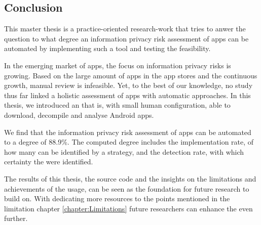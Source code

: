 \subsection{Conclusion}

This master thesis is a practice-oriented research-work that tries to anwer the question to what degree an information privacy risk assessment of \mH apps can be automated by implementing such a tool and testing the feasibility.

In the emerging market of \mH apps, the focus on information privacy risks is growing.
Based on the large amount of apps in the app stores and the continuous growth, manual review is infeasible.
Yet, to the best of our knowledge, no study thus far linked a holistic \ipr assessment of \mH apps with automatic \sca approaches.
In this thesis, we introduced an \aiprat that is, with small human configuration, able to download, decompile and analyse Android \mH apps.

We find that the information privacy risk assessment of \mH apps can be automated to a degree of 88.9\%.
The computed degree includes the implementation rate, of how many \ipr can be identified by a \sca strategy, and the detection rate, with which certainty the \ipr were identified.

The results of this thesis, the \aiprat source code and the insights on the limitations and achievements of the \sca usage, can be seen as the foundation for future research to build on.
With dedicating more resources to the points mentioned in the limitation chapter \ref{chapter:Limitations} future researchers can enhance the \aiprat even further.